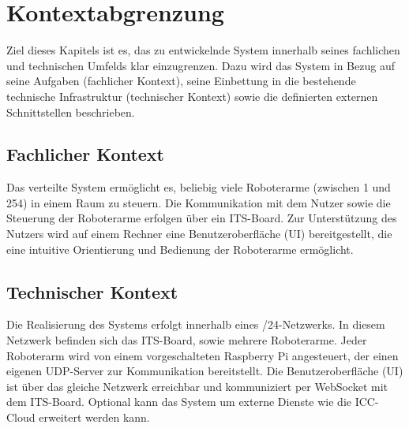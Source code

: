 \chapter{Kontextabgrenzung}
Ziel dieses Kapitels ist es, das zu entwickelnde System innerhalb seines fachlichen und technischen Umfelds klar einzugrenzen. Dazu wird das System in Bezug auf seine Aufgaben (fachlicher Kontext), seine Einbettung in die bestehende technische Infrastruktur (technischer Kontext) sowie die definierten externen Schnittstellen beschrieben.

\section{Fachlicher Kontext}


Das verteilte System ermöglicht es, beliebig viele Roboterarme (zwischen 1 und 254) in einem Raum zu steuern. Die Kommunikation mit dem Nutzer sowie die Steuerung der Roboterarme erfolgen über ein ITS-Board. 
Zur Unterstützung des Nutzers wird auf einem Rechner eine Benutzeroberfläche (UI) bereitgestellt, die eine intuitive Orientierung und Bedienung der Roboterarme ermöglicht.

\section{Technischer Kontext}

Die Realisierung des Systems erfolgt innerhalb eines /24-Netzwerks. In diesem Netzwerk befinden sich das ITS-Board, sowie mehrere Roboterarme.
Jeder Roboterarm wird von einem vorgeschalteten Raspberry Pi angesteuert, der einen eigenen UDP-Server zur Kommunikation bereitstellt. 
Die Benutzeroberfläche (UI) ist über das gleiche Netzwerk erreichbar und kommuniziert per WebSocket mit dem ITS-Board. %
Optional kann das System um externe Dienste wie die ICC-Cloud erweitert werden kann.



